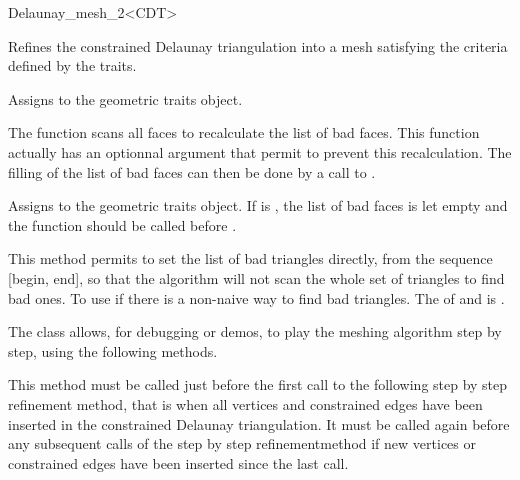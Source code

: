 \begin{ccRefClass}{Delaunay_mesh_2<CDT>}

{ Refines the constrained Delaunay triangulation into a mesh
  satisfying the criteria defined by the traits.
}

{ Assigns  to the geometric traits object. }

\begin{ccAdvanced}
  The function  scans all faces to recalculate the
  list of bad faces. This function actually has an optionnal argument that
  permit to prevent this recalculation. The filling of the list of bad
  faces can then be done by a call to .
  
  { Assigns  to the geometric traits object. If
     is , the list of bad faces is
    let empty and the function  should be called before
    .}

                   { This method permits to set the list of bad triangles
                     directly, from the sequence [begin, end], so that the
                     algorithm will not scan the whole set of triangles to
                     find bad ones. To use if there is a non-naive way to
                     find bad triangles.  \ccPrecond The 
                     of  and  is .}

\end{ccAdvanced}


\begin{ccAdvanced}

The \ccRefName{} class allows, for debugging or demos, to play the
meshing algorithm step by step, using the following methods.

         { This method must be called just before the first
             call to the following step by step refinement method,
             that is when all vertices and constrained edges have been
             inserted in the constrained Delaunay triangulation. It
             must be called again before any subsequent calls of the
             step by step refinementmethod if new vertices or constrained
             edges have been inserted since the last call.}


\end{ccAdvanced}
\end{ccRefClass}
